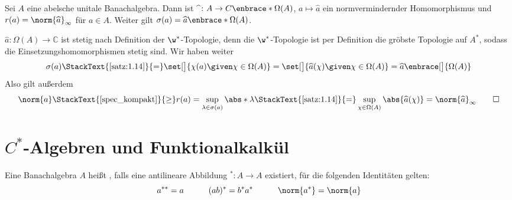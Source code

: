 \begin{satz}[label=satz:117,{name=[Gelfandtransformation ist normvermindernd]}]
	Sei $A$ eine abelsche unitale Banachalgebra.
	Dann ist $\widehat{\hspace{1ex}} \colon A \to C \enbrace*{\Omega(A)}$, $a \mapsto \widehat{a}$ ein normvermindernder Homomorphismus und $r(a) = \norm{\widehat{a}}_{\infty}$ für $a \in A$. 
	Weiter gilt $\sigma(a)= \widehat{a}\enbrace*{\Omega(A)}$.
\end{satz}
\begin{beweis}
	$\widehat{a} \colon \Omega(A) \to \mathbb{C}$ ist stetig nach Definition der $\w^*$-Topologie, denn die $\w^*$-Topologie ist per Definition die gröbste Topologie auf $A^*$, sodass die Einsetzungshomomorphismen stetig sind.
	Wir haben weiter
	\[
		\sigma(a) \StackText{\ref{satz:1.14}}{=} \set[\big]{\chi(a) \given \chi \in \Omega(A)}  = \set[\big]{\widehat{a}(\chi) \given \chi \in \Omega(A)} = \widehat{a} 
		\enbrace[\big]{\Omega(A)}
	\]
	Also gilt außerdem
	\[
		\norm{a} \StackText{\ref{spec_kompakt}}{\ge} r(a) = \sup_{\lambda \in \sigma(a)} \abs*{\lambda} \StackText{\ref{satz:1.14}}{=} \sup_{\chi \in \Omega(A)} \abs{\widehat{a}(\chi)} 
		= \norm{\widehat{a}}_{\infty} \qedhere
	\]
\end{beweis}
\newpage

\section{$C^*$-Algebren und Funktionalkalkül} %
\label{sec:2}

\begin{definition}[{name=[Involutive Banachalgebra]}]
	Eine Banachalgebra $A$ heißt , falls eine antilineare Abbildung ${}^* \colon A \to A$ existiert, für die folgenden Identitäten gelten:
	\[
		a^{**}=a \qquad \quad (ab)^*= b^* a^* \qquad \quad \norm{a^*} = \norm{a}  
	\] 
\end{definition}

